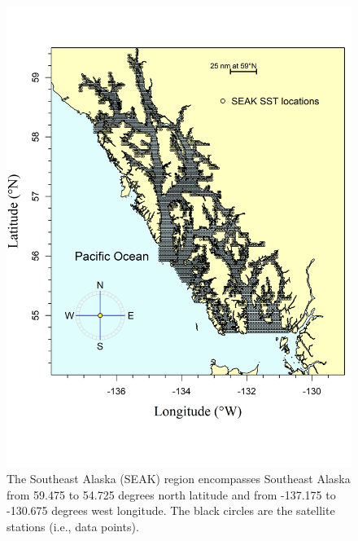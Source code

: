\documentclass[
]{article}
\begin{document}
\begin{figure}
\centering
\includegraphics{../../2024_forecast/results/temperature_data/SEAK.png}
\caption{The Southeast Alaska (SEAK) region encompasses Southeast Alaska
from 59.475 to 54.725 degrees north latitude and from -137.175 to
-130.675 degrees west longitude. The black circles are the satellite
stations (i.e., data points).}
\end{figure}
\end{document}
